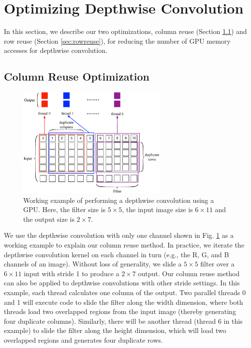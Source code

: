 \section{Optimizing Depthwise Convolution}
\label{sec:strategies} In this section, we describe our two optimizations, column reuse (Section \ref{sec:creuse}) and row reuse (Section
\ref{sec:rowreuse}), for reducing the number of GPU memory accesses for depthwise convolution.
\subsection{Column Reuse Optimization}
\label{sec:creuse}


\begin{figure}[t!]
\centering
  \includegraphics[width=0.9\columnwidth,height=5.5cm]{./figure/twostrategies.eps}
  \caption{Working example of performing a depthwise convolution using a GPU. Here, the filter size is $5 \times 5$, the input image size is $6 \times 11$
  and the output size is $2 \times 7$.}
  \label{fig:twostrategies}
\end{figure}


 We use the depthwise convolution with only one channel shown in Fig. \ref{fig:twostrategies} as a working
example to explain our column reuse method. In practice, we iterate the depthwise convolution kernel on each channel in turn (e.g., the R,
G, and B channels of an image). Without loss of generality, we slide a $5 \times 5$ filter over a $6 \times 11$ input with stride 1 to
produce a $2 \times 7$ output. Our column reuse method can also be applied to depthwise convolutions with other stride settings. In this
example, each thread calculates one column of the output. Two parallel threads 0 and 1 will execute code to slide the filter along the
width dimension, where both threads load two overlapped regions from the input image (thereby generating four duplicate columns).
Similarly, there will be another thread (thread 6 in this example) to slide the filter along the height dimension, which will load two
overlapped regions and generates four duplicate rows.


